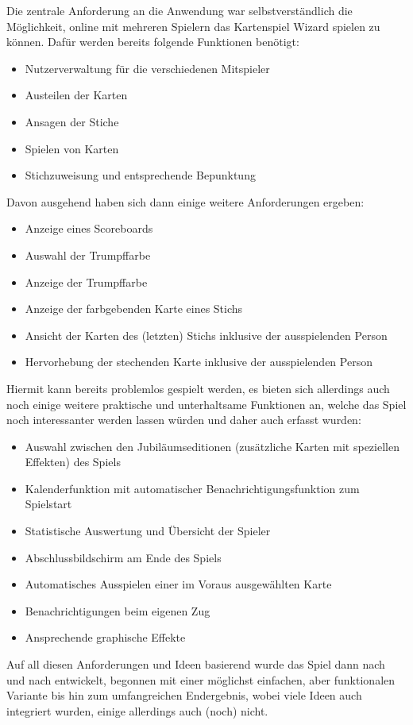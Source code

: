 Die zentrale Anforderung an die Anwendung war selbstverständlich die Möglichkeit, online mit mehreren Spielern das Kartenspiel Wizard spielen zu können. Dafür werden bereits folgende Funktionen benötigt:
\begin{itemize}
	\item Nutzerverwaltung für die verschiedenen Mitspieler
	\item Austeilen der Karten
	\item Ansagen der Stiche
	\item Spielen von Karten
	\item Stichzuweisung und entsprechende Bepunktung
\end{itemize}
Davon ausgehend haben sich dann einige weitere Anforderungen ergeben:
\begin{itemize}
	\item Anzeige eines Scoreboards
	\item Auswahl der Trumpffarbe
	\item Anzeige der Trumpffarbe
	\item Anzeige der farbgebenden Karte eines Stichs
	\item Ansicht der Karten des (letzten) Stichs inklusive der ausspielenden Person
	\item Hervorhebung der stechenden Karte inklusive der ausspielenden Person
\end{itemize}
Hiermit kann bereits problemlos gespielt werden, es bieten sich allerdings auch noch einige weitere praktische und unterhaltsame Funktionen an, welche das Spiel noch interessanter werden lassen würden und daher auch erfasst wurden:
\begin{itemize}
	\item Auswahl zwischen den Jubiläumseditionen (zusätzliche Karten mit speziellen Effekten) des Spiels
	\item Kalenderfunktion mit automatischer Benachrichtigungsfunktion zum Spielstart
	\item Statistische Auswertung und Übersicht der Spieler
	\item Abschlussbildschirm am Ende des Spiels
	\item Automatisches Ausspielen einer im Voraus ausgewählten Karte
	\item Benachrichtigungen beim eigenen Zug
	\item Ansprechende graphische Effekte
\end{itemize}
Auf all diesen Anforderungen und Ideen basierend wurde das Spiel dann nach und nach entwickelt, begonnen mit einer möglichst einfachen, aber funktionalen Variante bis hin zum umfangreichen Endergebnis, wobei viele Ideen auch integriert wurden, einige allerdings auch (noch) nicht.

